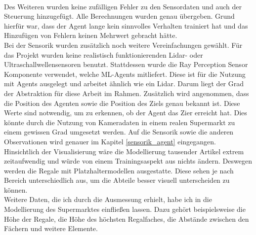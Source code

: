 \\
Des Weiteren wurden keine zufälligen Fehler zu den Sensordaten und auch der Steuerung hinzugefügt. Alle Berechnungen wurden genau übergeben. Grund hierfür war, dass der Agent lange kein sinnvolles Verhalten trainiert hat und das Hinzufügen von Fehlern keinen Mehrwert gebracht hätte.
\\
Bei der Sensorik wurden zusätzlich noch weitere Vereinfachungen gewählt. Für das Projekt wurden keine realistisch funktionierenden Lidar- oder Ultraschallwellensensoren benutzt. Stattdessen wurde die Ray Perception Sensor Komponente verwendet, welche ML-Agents mitliefert. Diese ist für die Nutzung mit Agents ausgelegt und arbeitet ähnlich wie ein Lidar. Darum liegt der Grad der Abstraktion für diese Arbeit im Rahmen. Zusätzlich wird angenommen, dass die Position des Agenten sowie die Position des Ziels genau bekannt ist. Diese Werte sind notwendig, um zu erkennen, ob der Agent das Zier erreicht hat. Dies könnte durch die Nutzung von Kameradaten in einem realen Supermarkt zu einem gewissen Grad umgesetzt werden. Auf die Sensorik sowie die anderen Observationen wird genauer im Kapitel \ref{sensorik_agent} eingegangen.
\\
Hinsichtlich der Visualisierung wäre die Modellierung tausender Artikel extrem zeitaufwendig und würde von einem Trainingsaspekt aus nichts ändern. Deswegen werden die Regale mit Platzhaltermodellen ausgestatte. Diese sehen je nach Bereich unterschiedlich aus, um die Abteile besser visuell unterscheiden zu können. 
\\
Weitere Daten, die ich durch die Ausmessung erhielt, habe ich in die Modellierung des Supermarktes einfließen lassen. Dazu gehört beispielsweise die Höhe der Regale, die Höhe des höchsten Regalfaches, die Abstände zwischen den Fächern und weitere Elemente.
